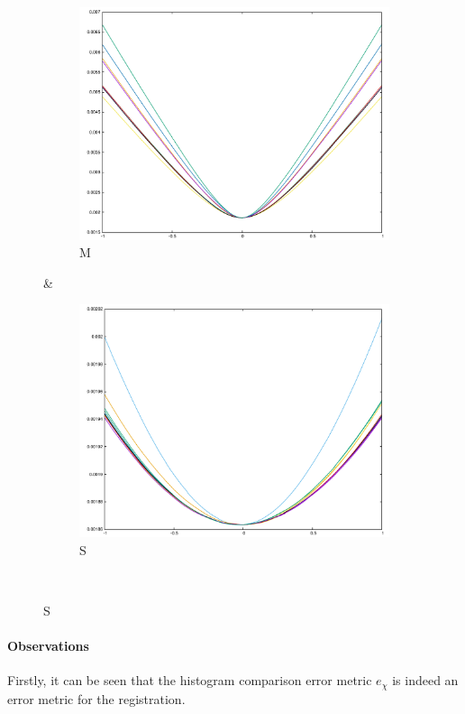 {\begin{figure}[H]
\begin{subfigure}{.33\textwidth}
	\includegraphics[width=\linewidth]{fig/ajherr/t/M_mae.pdf}
	\caption{M}
\end{subfigure}&
\begin{subfigure}{.33\textwidth}
	\includegraphics[width=\linewidth]{fig/ajherr/t/S_mae.pdf}
	\caption{S}
\end{subfigure}\\
\end{figure}

\paragraph{Observations} Firstly, it can be seen that the histogram comparison error metric $e_{\chi}$ is indeed an error metric for the registration.

}
